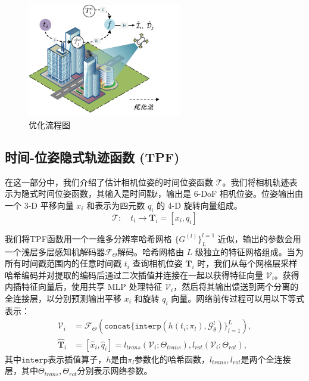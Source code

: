 \begin{figure}[ht]
    \centering
    \includegraphics[width=0.6\textwidth]{undergraduate-thesis/images/time-pose function/Problem Formulation export.pdf}
    \caption{优化流程图}
    \label{fig:time-pose function optimization flow}
\end{figure}

\subsection{时间-位姿隐式轨迹函数 (TPF)}
在这一部分中，我们介绍了估计相机位姿的时间位姿函数 $\mathcal{T}$。我们将相机轨迹表示为隐式时间位姿函数，其输入是时间戳$t$，输出是 6-DoF 相机位姿。位姿输出由一个 3-D 平移向量 $x_i$ 和表示为四元数\cite{sola_micro_2021} $q_i$ 的 4-D 旋转向量组成。
\begin{equation}
    \mathcal{T}:\quad t_i\to\mathbf{T}_i=[x_i, q_i]
\end{equation}

我们将TPF函数用一个一维多分辨率哈希网格 $\{G^{(l)}\}_L^{l=1}$ 近似，输出的参数会用一个浅层多层感知机解码器$\mathcal{F}_\Theta$解码。哈希网格由 $L$ 级独立的特征网格组成。当为所有时间戳范围内的任意时间戳 $t_i$ 查询相机位姿 $\mathbf{T}_i$ 时，我们从每个网格层采样哈希编码并对提取的编码后通过二次插值并连接在一起以获得特征向量 $\mathcal{V}_i$。获得内插特征向量后，使用共享 MLP 处理特征 $\mathcal{V}_i$，然后将其输出馈送到两个分离的全连接层，以分别预测输出平移 $x_i$ 和旋转 $q_i$ 向量。网络前传过程可以用以下等式表示：
\begin{align}
    \mathcal{V}_i&=\mathcal{F}_\Theta(\mathtt{concat}\{\mathtt{interp}(h(t_i;\pi_l), \mathcal{G}_\theta^l)\}^L_{l=1}),\\
    \hat{\mathbf{T}}_i &= [\hat{x}_i, \hat{q}_i] = l_{trans}(\mathcal{V}_i; \Theta_{trans}), l_{rot}(\mathcal{V}_i; \Theta_{rot}),
\end{align}
其中$\mathtt{interp}$表示插值算子，$h$是由$π_l$参数化的哈希函数，$l_{trans},l_{rot}$是两个全连接层，其中$\Theta_{trans},\Theta_{rot}$分别表示网络参数。

